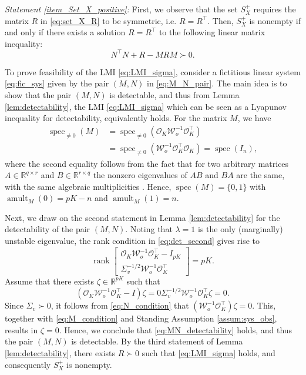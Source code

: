 \documentclass{ifacconf}
\DeclareMathOperator{\rank}{rank}
\DeclareMathOperator{\spec}{spec}
\DeclareMathOperator{\Alg}{amult}
\newcommand{\calO}{\ensuremath{\mathcal{O}}}
\newcommand{\calW}{\ensuremath{\mathcal{W}}}
\newcommand{\R}{\ensuremath{\mathbb R}}
\newcommand{\bse}{\begin{subequations}}
\newcommand{\ese}{\end{subequations}}
\def\be{\begin{equation}}
\def\ee{\end{equation}}
\newcommand{\bbm}{\begin{bmatrix}}
\newcommand{\ebm}{\end{bmatrix}}
\newcommand{\+}{\mathsmaller{+}}
\begin{document}
\textit{Statement \ref{item_Set_X_positive}:}
	First, we observe that the set $S_{X}^+$ requires the matrix $R$ in \eqref{eq:set_X_R} to be symmetric, i.e. $R = R^{\top}$. Then, $S_X^+$ is nonempty if and only if there exists a solution $R=R^\top$ to the following linear matrix inequality:
	\be\label{eq:LMI_sigma}
	N^{\top}N + R - MRM \succ 0.
	\ee
 \par To prove feasibility of the LMI \eqref{eq:LMI_sigma}, consider a fictitious  linear system \eqref{eq:fic_sys} given by the pair $(M, N)$ in \eqref{eq:M_N_pair}. The main idea is to show that the pair $(M, N)$ is detectable, and thus from Lemma \ref{lem:detectability}, the LMI \eqref{eq:LMI_sigma} which can be seen as a Lyapunov inequality for detectability, equivalently holds. For the matrix $M$, we have
	  \be \label{eq:eig_M}
	\begin{aligned}
	 \spec_{\neq0}(M)  & = \spec_{\neq0}(\calO_K\calW_o^{-1} \calO_K^ \top) \\& =  \spec_{\neq0}(\calW_o^{-1} \calO_K^ \top\calO_K)  =  \spec(I_n),
	\end{aligned}
	\ee
where the second equality  follows from the fact that for two arbitrary matrices $A \in \R^{q\times r}$ and $B\in \R^{r \times q}$  the nonzero eigenvalues of $AB$ and $BA$ are the same, with the same algebraic multiplicities \cite[p. 214]{garcia2017second}. Hence, $\spec(M)=\{0,1\}$ 
	 with $\Alg_{M}(0)= pK-n$ and $\Alg_{M}(1) = n$.
	  \par Next, we draw on the second statement in Lemma \ref{lem:detectability} for the detectability of the pair $(M, N)$. 
	Noting that $\lambda=1$ is the only (marginally) unstable eigenvalue, the rank condition in \eqref{eq:det_second} gives rise to
	\be \label{eq:MN_detectability}
	\rank \bbm \calO_K\calW_o^{-1} \calO_K^ \top-I_{pK} \\ \Sigma_v^{-1/2}\calW_o^{-1} \calO_K^ \top \ebm = pK.
	\ee
	Assume that there exists $\zeta \in \R^{pK}$ such that 
	\bse
	\be\label{eq:M_condition}
	(\calO_K\calW_o^{-1} \calO_K^ \top - I)\zeta = 0 
	\ee
	\be\label{eq:N_condition}
	\Sigma_v^{-1/2}\calW_o^{-1} \calO_K^ \top \zeta = 0.
	\ee
	\ese
	Since $\Sigma_v \succ 0$, it follows from \eqref{eq:N_condition} that $(\calW_o^{-1} \calO_K^ \top) \zeta = 0$. This, together with \eqref{eq:M_condition} and Standing Assumption \ref{assum:sys_obs},  results in $\zeta = 0$. Hence, we conclude that  \eqref{eq:MN_detectability} holds, and thus the pair $(M, N)$ is detectable. By the third statement of Lemma \ref{lem:detectability}, 
	there exists $R \succ 0$ such that \eqref{eq:LMI_sigma} holds, and consequently $S_X^+$ is nonempty.  
\end{document}

